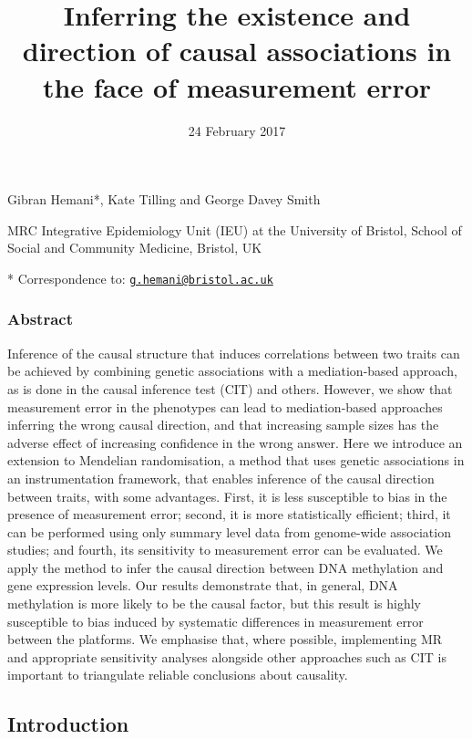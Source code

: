 \documentclass[]{article}
\title{Inferring the existence and direction of causal associations in the face
of measurement error}
\author{}
\date{24 February 2017}
\begin{document}
\maketitle

Gibran Hemani*, Kate Tilling and George Davey Smith

MRC Integrative Epidemiology Unit (IEU) at the University of Bristol,
School of Social and Community Medicine, Bristol, UK

* Correspondence to:
\href{mailto:g.hemani@bristol.ac.uk}{\nolinkurl{g.hemani@bristol.ac.uk}}

\subsubsection{Abstract}\label{abstract}

Inference of the causal structure that induces correlations between two
traits can be achieved by combining genetic associations with a
mediation-based approach, as is done in the causal inference test (CIT)
and others. However, we show that measurement error in the phenotypes
can lead to mediation-based approaches inferring the wrong causal
direction, and that increasing sample sizes has the adverse effect of
increasing confidence in the wrong answer. Here we introduce an
extension to Mendelian randomisation, a method that uses genetic
associations in an instrumentation framework, that enables inference of
the causal direction between traits, with some advantages. First, it is
less susceptible to bias in the presence of measurement error; second,
it is more statistically efficient; third, it can be performed using
only summary level data from genome-wide association studies; and
fourth, its sensitivity to measurement error can be evaluated. We apply
the method to infer the causal direction between DNA methylation and
gene expression levels. Our results demonstrate that, in general, DNA
methylation is more likely to be the causal factor, but this result is
highly susceptible to bias induced by systematic differences in
measurement error between the platforms. We emphasise that, where
possible, implementing MR and appropriate sensitivity analyses alongside
other approaches such as CIT is important to triangulate reliable
conclusions about causality.

\subsection{Introduction}\label{introduction}
\end{document}
